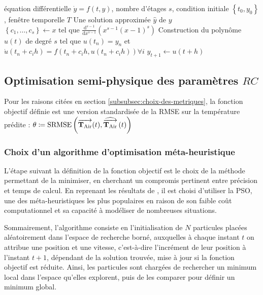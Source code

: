         \begin{algorithm}[H]
            \caption{Méthode Radau, adaptée de \cite{radau}}
            \label{alg:radau}
            \begin{algorithmic}[1]
                \Require équation différentielle $\dot y = f(t,y)$, nombre d'étages $s$, condition initiale $\left\{t_0, y_0\right\}$, fenêtre temporelle $T$
                \Ensure Une solution approximée $\hat y$ de $y$
                \State $\left\{c_1, \dots, c_s\right\} \gets x \text{ tel que }\frac{\mathrm d^{s-1}}{\mathrm dx^{s-1}}\left(x^{s-1} \left(x-1\right)^s\right)$
                \State Construction du polynôme $u(t)$ de degré $s$ tel que $u\left(t_n\right)=y_n$ et $\dot u\left(t_n + c_i h\right)=f\left(t_n + c_i h, u\left(t_n + c_i h\right)\right) \forall i$
                    \State $y_{t+1} \gets u\left(t + h\right)$
                \EndFor
                \Return
            \end{algorithmic}
        \end{algorithm}
    \subsection{Optimisation semi-physique des paramètres $RC$}\label{subsec:optimisation-semi-physique-des-parametres-rc}
        Pour les raisons citées en section \ref{subsubsec:choix-des-metriques}, la fonction objectif définie est une version standardisée de la RMSE sur la température prédite : $\theta \coloneqq \mathrm{SRMSE}\left( \operatorname{\overrightarrow{\mathbf{T}_{\text{Air}}}}(t), \operatorname{\widehat{\overrightarrow{\mathbf{T}_{\text{Air}}}}}\left(t\right) \right)$

        \subsubsection{Choix d'un algorithme d'optimisation méta-heuristique}
            L'étape suivant la définition de la fonction objectif est le choix de la méthode permettant de la minimiser, en cherchant un compromis pertinent entre précision et temps de calcul.
            En reprenant les résultats de \cite{TST}, il est choisi d'utiliser la \gls{PSO}, une des méta-heuristiques les plus populaires en raison de son faible coût computationnel et sa capacité à modéliser de nombreuses situations.

            Sommairement, l'\gls{algorithme} consiste en l'initialisation de $N$ particules placées aléatoirement dans l'espace de recherche borné, auxquelles à chaque instant $t$ on attribue une position et une vitesse, c'est-à-dire l'incrément de leur position à l'instant $t+1$, dépendant de la solution trouvée, mise à jour si la fonction objectif est réduite.
            Ainsi, les particules sont chargées de rechercher un minimum local dans l'espace qu'elles explorent, puis de les comparer pour définir un minimum global.

